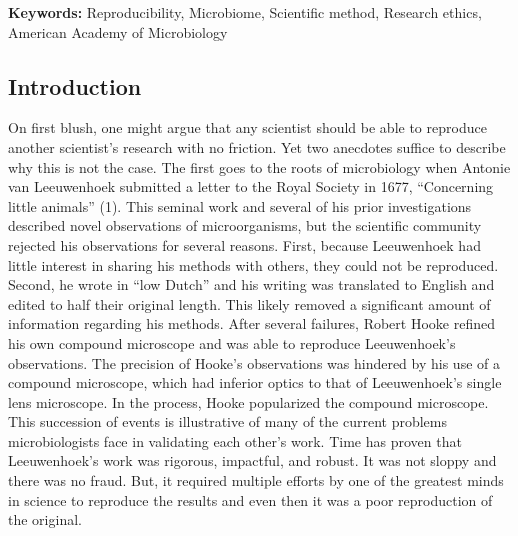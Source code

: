 \documentclass[]{article}
\begin{document}
\textbf{Keywords:} Reproducibility, Microbiome, Scientific method,
Research ethics, American Academy of Microbiology

\newpage

\subsection{Introduction}\label{introduction}

On first blush, one might argue that any scientist should be able to
reproduce another scientist's research with no friction. Yet two
anecdotes suffice to describe why this is not the case. The first goes
to the roots of microbiology when Antonie van Leeuwenhoek submitted a
letter to the Royal Society in 1677, ``Concerning little animals'' (1).
This seminal work and several of his prior investigations described
novel observations of microorganisms, but the scientific community
rejected his observations for several reasons. First, because
Leeuwenhoek had little interest in sharing his methods with others, they
could not be reproduced. Second, he wrote in ``low Dutch'' and his
writing was translated to English and edited to half their original
length. This likely removed a significant amount of information
regarding his methods. After several failures, Robert Hooke refined his
own compound microscope and was able to reproduce Leeuwenhoek's
observations. The precision of Hooke's observations was hindered by his
use of a compound microscope, which had inferior optics to that of
Leeuwenhoek's single lens microscope. In the process, Hooke popularized
the compound microscope. This succession of events is illustrative of
many of the current problems microbiologists face in validating each
other's work. Time has proven that Leeuwenhoek's work was rigorous,
impactful, and robust. It was not sloppy and there was no fraud. But, it
required multiple efforts by one of the greatest minds in science to
reproduce the results and even then it was a poor reproduction of the
original.
\end{document}
